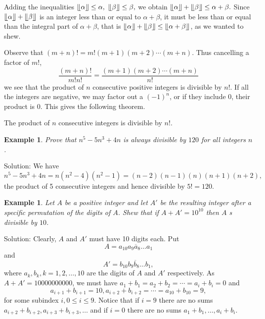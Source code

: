 \documentclass[11pt, openany]{book}
\theoremstyle{change} \theoremheaderfont{\blue\sffamily\bfseries}
\newtheorem{exa}[thm]{Example}
\theoremstyle{nonumberplain} \theoremheaderfont{\sffamily\bfseries}
\newcommand{\í}{\'{\i}}
\begin{document}
Adding the inequalities $\llfloor \alpha \rrfloor \leq \alpha, \
\llfloor \beta \rrfloor \leq \beta,$ we obtain $\llfloor \alpha
\rrfloor + \llfloor \beta \rrfloor \leq \alpha + \beta .$ Since
$\llfloor \alpha \rrfloor + \llfloor \beta \rrfloor$ is an integer
less than or equal to $\alpha + \beta$, it must be less than or
equal than the integral part of $\alpha + \beta$, that is $\llfloor
\alpha\rrfloor + \llfloor\beta\rrfloor \leq \llfloor\alpha +
\beta\rrfloor$, as we wanted to shew.





Observe that $(m + n)! = m!(m + 1)(m + 2)\cdots (m + n)$. Thus
cancelling a factor of $m!$,
$$\frac{(m + n)!}{m!n!}
= \frac{(m + 1)(m + 2)\cdots (m + n)}{n!}$$ we see that the product
of $n$ consecutive positive integers is divisible by $n!$. If all
the integers are negative, we may factor out a $(-1)^n$, or if they
include $0$, their product is $0$. This gives the following theorem.
\begin{thm}
The product of $n$ consecutive integers is divisible by $n!$.
\end{thm}



\begin{exa} Prove that $n^5 - 5n^3 + 4n$ is always divisible by $120$ for all integers $n$. \end{exa}
Solution: We have
$$n^5 - 5n^3 + 4n = n(n^2 - 4)(n^2 - 1) = (n - 2)(n - 1)(n)(n + 1)(n + 2),$$
the product of 5 consecutive integers and hence divisible by $5! =
120.$

\begin{exa} Let $A$ be a positive integer and let $A'$ be the resulting integer after a specific
permutation of the digits of $A$. Shew that if $A + A' = 10^{10}$
then $A$ s divisible by $10$.\end{exa} Solution: Clearly, $A$ and
$A'$ must have 10 digits each. Put
$$A = \overline{a_{10}a_9a_8\ldots a_1}$$and $$A' = \overline{b_{10}b_9b_8\ldots b_1},$$
where $a_k, b_k, k = 1, 2, \ldots , 10$ are the  digits of $A$ and
$A'$ respectively. As $A + A' = 10000000000$, we must have $a_1 +
b_1 = a_2 + b_2 = \cdots = a_i + b_i  = 0$ and
$$a_{i + 1} + b_{i + 1}= 10,   a_{i + 2} + b_{i + 2} = \cdots = a_{10} + b_{10} = 9, $$
for some subindex $i, 0 \leq i \leq 9$. Notice that if $i = 9$
there are no sums $a_{i + 2} + b_{i + 2}, a_{i + 3} + b_{i + 3},
\ldots$ and if $i = 0$ there are no sums $a_1 + b_1, \ldots , a_i
+ b_i.$
\end{document}
